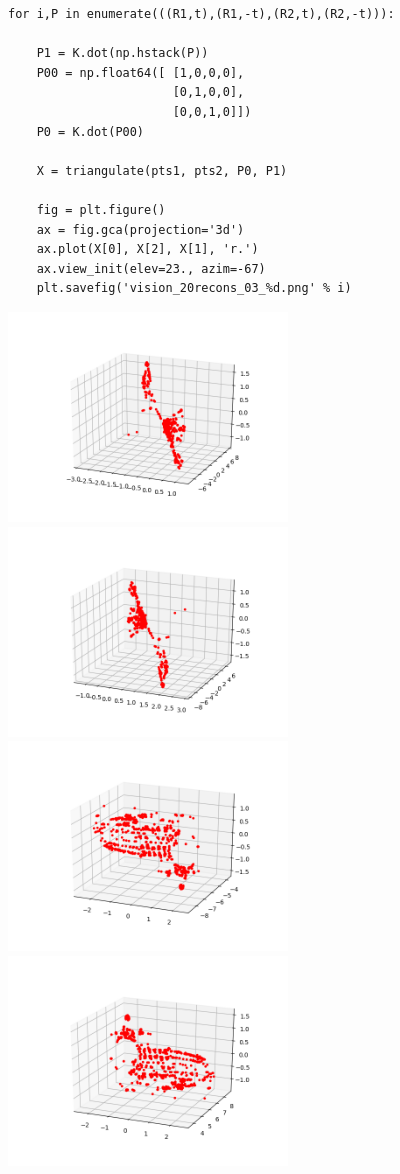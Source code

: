 \documentclass[12pt,fleqn]{article}\usepackage{../../common}
\begin{document}
\begin{verbatim}
for i,P in enumerate(((R1,t),(R1,-t),(R2,t),(R2,-t))):

    P1 = K.dot(np.hstack(P))
    P00 = np.float64([ [1,0,0,0],
                       [0,1,0,0],
                       [0,0,1,0]])
    P0 = K.dot(P00) 

    X = triangulate(pts1, pts2, P0, P1)

    fig = plt.figure()
    ax = fig.gca(projection='3d')    
    ax.plot(X[0], X[2], X[1], 'r.')
    ax.view_init(elev=23., azim=-67)
    plt.savefig('vision_20recons_03_%d.png' % i)
\end{verbatim}

\includegraphics[width=20em]{vision_20recons_03_0.png}
\includegraphics[width=20em]{vision_20recons_03_1.png}
\includegraphics[width=20em]{vision_20recons_03_2.png}
\includegraphics[width=20em]{vision_20recons_03_3.png}
\end{document}
